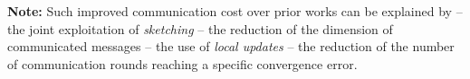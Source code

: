 \documentclass[sigconf, anonymous, review]{acmart}
\begin{document}
\textbf{Note:}
Such improved communication cost over prior works can be explained by -- the joint exploitation of \emph{sketching} -- the reduction of the dimension of communicated messages -- the use of \emph{local updates} -- the reduction of the number of communication rounds reaching a specific convergence error.
%
%        
\end{document}
